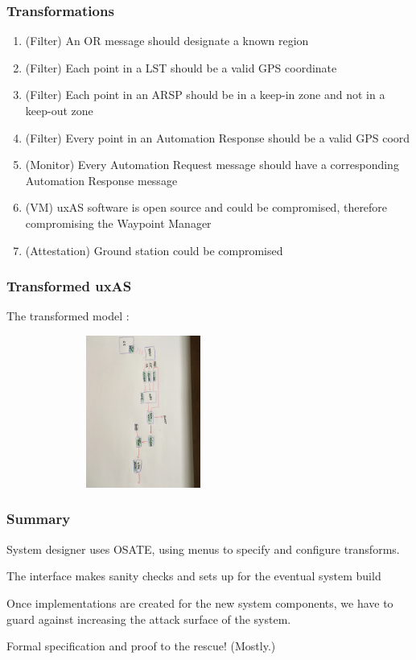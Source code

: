 \documentclass{beamer}
\begin{document}
\begin{frame}\frametitle{Transformations}

\begin{enumerate}
\item (Filter) An OR message should designate a known region
\item (Filter) Each point in a LST should be a valid GPS coordinate
\item (Filter) Each point in an ARSP should be in a keep-in zone and not in a keep-out zone
\item (Filter) Every point in an Automation Response should be a valid GPS coord
\item (Monitor) Every Automation Request message should have a corresponding Automation Response
            message
\item (VM) uxAS software is open source and could be compromised,
      therefore compromising the Waypoint Manager
\item (Attestation) Ground station could be compromised
\end{enumerate}

\end{frame}

\begin{frame}\frametitle{Transformed uxAS}

The transformed model :

\includegraphics[width=90mm,height=50mm]{final-arch.jpg}


\end{frame}

\begin{frame}\frametitle{Summary}

System designer uses OSATE, using menus to specify and configure transforms.

The interface makes sanity checks and sets up for the eventual system build

Once implementations are created for the new system components, we
have to guard against increasing the attack surface of the system.

Formal specification and proof to the rescue! (Mostly.)

\end{frame}
\end{document}

